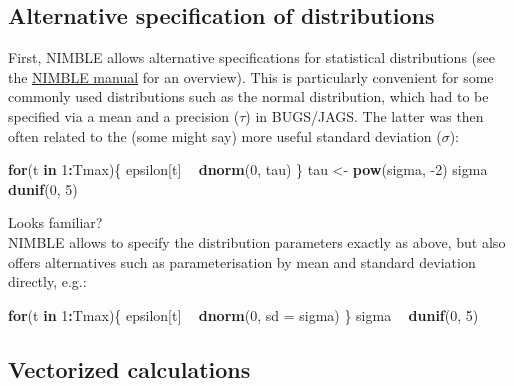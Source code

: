 \documentclass[
]{book}
\newenvironment{Shaded}{\begin{snugshade}}{\end{snugshade}}
\newcommand{\ControlFlowTok}[1]{\textcolor[rgb]{0.13,0.29,0.53}{\textbf{#1}}}
\newcommand{\DataTypeTok}[1]{\textcolor[rgb]{0.13,0.29,0.53}{#1}}
\newcommand{\DecValTok}[1]{\textcolor[rgb]{0.00,0.00,0.81}{#1}}
\newcommand{\KeywordTok}[1]{\textcolor[rgb]{0.13,0.29,0.53}{\textbf{#1}}}
\newcommand{\NormalTok}[1]{#1}
\newcommand{\OperatorTok}[1]{\textcolor[rgb]{0.81,0.36,0.00}{\textbf{#1}}}
\newcommand{\StringTok}[1]{\textcolor[rgb]{0.31,0.60,0.02}{#1}}
\begin{document}
\hypertarget{alternative-specification-of-distributions}{%
\subsection{Alternative specification of distributions}\label{alternative-specification-of-distributions}}

First, NIMBLE allows alternative specifications for statistical distributions
(see the \href{https://r-nimble.org/manuals/NimbleUserManual.pdf}{NIMBLE manual}
for an overview). This is particularly convenient for some commonly used
distributions such as the normal distribution, which had to be specified via
a mean and a precision (\(\tau\)) in BUGS/JAGS. The latter was then often related
to the (some might say) more useful standard deviation (\(\sigma\)):

\begin{Shaded}
\begin{Highlighting}[]
\ControlFlowTok{for}\NormalTok{(t }\ControlFlowTok{in} \DecValTok{1}\OperatorTok{:}\NormalTok{Tmax)\{}
\NormalTok{  epsilon[t] }\OperatorTok{~}\StringTok{ }\KeywordTok{dnorm}\NormalTok{(}\DecValTok{0}\NormalTok{, tau)}
\NormalTok{\}}
\NormalTok{tau <-}\StringTok{ }\KeywordTok{pow}\NormalTok{(sigma, }\DecValTok{-2}\NormalTok{)}
\NormalTok{sigma }\OperatorTok{~}\StringTok{ }\KeywordTok{dunif}\NormalTok{(}\DecValTok{0}\NormalTok{, }\DecValTok{5}\NormalTok{)}
\end{Highlighting}
\end{Shaded}

Looks familiar?\\
NIMBLE allows to specify the distribution parameters exactly as above, but also
offers alternatives such as parameterisation by mean and standard deviation
directly, e.g.:

\begin{Shaded}
\begin{Highlighting}[]
\ControlFlowTok{for}\NormalTok{(t }\ControlFlowTok{in} \DecValTok{1}\OperatorTok{:}\NormalTok{Tmax)\{}
\NormalTok{  epsilon[t] }\OperatorTok{~}\StringTok{ }\KeywordTok{dnorm}\NormalTok{(}\DecValTok{0}\NormalTok{, }\DataTypeTok{sd =}\NormalTok{ sigma)}
\NormalTok{\}}
\NormalTok{sigma }\OperatorTok{~}\StringTok{ }\KeywordTok{dunif}\NormalTok{(}\DecValTok{0}\NormalTok{, }\DecValTok{5}\NormalTok{)}
\end{Highlighting}
\end{Shaded}

\hypertarget{vectorized-calculations}{%
\subsection{Vectorized calculations}\label{vectorized-calculations}}
\end{document}
